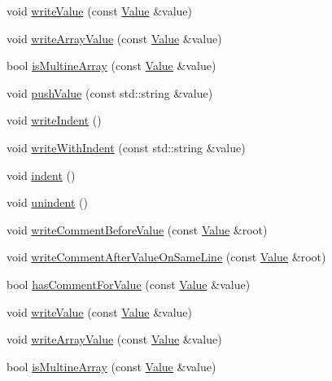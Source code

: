 \begin{DoxyCompactItemize}
\item 
void \hyperlink{classJson_1_1StyledStreamWriter_a4359250e09273fa0144021684be001ae}{write\-Value} (const \hyperlink{classJson_1_1Value}{Value} \&value)
\item 
void \hyperlink{classJson_1_1StyledStreamWriter_a606f2ddd58093c9b019d452c1b6f09fe}{write\-Array\-Value} (const \hyperlink{classJson_1_1Value}{Value} \&value)
\item 
bool \hyperlink{classJson_1_1StyledStreamWriter_a88f4d342cf25c73aabf77c1b8ba01e44}{is\-Multine\-Array} (const \hyperlink{classJson_1_1Value}{Value} \&value)
\item 
void \hyperlink{classJson_1_1StyledStreamWriter_ae626a0ab8a529e0e524924f1ab3b1a0d}{push\-Value} (const std\-::string \&value)
\item 
void \hyperlink{classJson_1_1StyledStreamWriter_a5a52fa5b406f1580a61dde3b5638e76d}{write\-Indent} ()
\item 
void \hyperlink{classJson_1_1StyledStreamWriter_a602fd51aa92cac1f18351806f1d9c8cc}{write\-With\-Indent} (const std\-::string \&value)
\item 
void \hyperlink{classJson_1_1StyledStreamWriter_ab49409578422aa73b060e3492dd6c72a}{indent} ()
\item 
void \hyperlink{classJson_1_1StyledStreamWriter_a74d8fb9beecd29759d7b79f430386358}{unindent} ()
\item 
void \hyperlink{classJson_1_1StyledStreamWriter_a79c3c2b320475035c47b2db484a3e434}{write\-Comment\-Before\-Value} (const \hyperlink{classJson_1_1Value}{Value} \&root)
\item 
void \hyperlink{classJson_1_1StyledStreamWriter_ad2ca860e317ca91d6b2932535b4ce9c7}{write\-Comment\-After\-Value\-On\-Same\-Line} (const \hyperlink{classJson_1_1Value}{Value} \&root)
\item 
bool \hyperlink{classJson_1_1StyledStreamWriter_ad2892f57171919fa4f8a5ae5574755cf}{has\-Comment\-For\-Value} (const \hyperlink{classJson_1_1Value}{Value} \&value)
\item 
void \hyperlink{classJson_1_1StyledStreamWriter_a4359250e09273fa0144021684be001ae}{write\-Value} (const \hyperlink{classJson_1_1Value}{Value} \&value)
\item 
void \hyperlink{classJson_1_1StyledStreamWriter_a606f2ddd58093c9b019d452c1b6f09fe}{write\-Array\-Value} (const \hyperlink{classJson_1_1Value}{Value} \&value)
\item 
bool \hyperlink{classJson_1_1StyledStreamWriter_a88f4d342cf25c73aabf77c1b8ba01e44}{is\-Multine\-Array} (const \hyperlink{classJson_1_1Value}{Value} \&value)

\end{DoxyCompactItemize}
